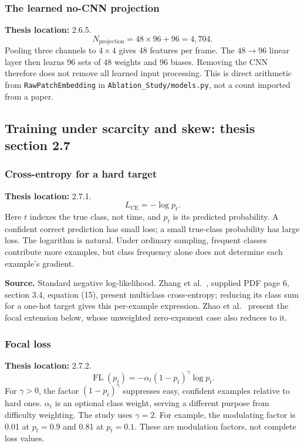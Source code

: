 \documentclass[11pt,a4paper]{article}
\numberwithin{equation}{section}
\begin{document}
\subsubsection{The learned no-CNN projection}
\label{fg:projection}
\textbf{Thesis location:} 2.6.5.
\begin{equation}
    N_{\mathrm{projection}}=48\times96+96=4{,}704.
    \label{fg:eq:projection}
\end{equation}
Pooling three channels to $4\times4$ gives 48 features per frame. The
$48\rightarrow96$ linear layer then learns 96 sets of 48 weights and 96
biases. Removing the CNN therefore does not remove all learned input
processing. This is direct arithmetic from \texttt{RawPatchEmbedding} in
\texttt{Ablation\_Study/models.py}, not a count imported from a paper.

\subsection{Training under scarcity and skew: thesis section 2.7}

\subsubsection{Cross-entropy for a hard target}
\label{fg:ce}
\textbf{Thesis location:} 2.7.1.
\begin{equation}
    L_{\mathrm{CE}}=-\log p_t.
    \label{fg:eq:ce}
\end{equation}
Here $t$ indexes the true class, not time, and $p_t$ is its predicted
probability. A confident correct prediction has small loss; a small true-class
probability has large loss. The logarithm is natural. Under ordinary sampling,
frequent classes contribute more examples, but class frequency alone does not
determine each example's gradient.

\textbf{Source.} Standard negative log-likelihood. Zhang
et al.~\cite{zhang2022}, supplied PDF page 6, section 3.4, equation (15),
present multiclass cross-entropy; reducing its class sum for a one-hot target
gives this per-example expression. Zhao et al.~\cite{zhaoS2021} present the
focal extension below, whose unweighted zero-exponent case also reduces to it.

\subsubsection{Focal loss}
\label{fg:focal}
\textbf{Thesis location:} 2.7.2.
\begin{equation}
    \operatorname{FL}(p_t)=-\alpha_t(1-p_t)^\gamma\log p_t.
    \label{fg:eq:focal}
\end{equation}
For $\gamma>0$, the factor $(1-p_t)^\gamma$ suppresses easy, confident examples
relative to hard ones. $\alpha_t$ is an optional class weight, serving a
different purpose from difficulty weighting. The study uses $\gamma=2$.
For example, the modulating factor is 0.01 at $p_t=0.9$ and 0.81 at $p_t=0.1$.
These are modulation factors, not complete loss values.
\end{document}
